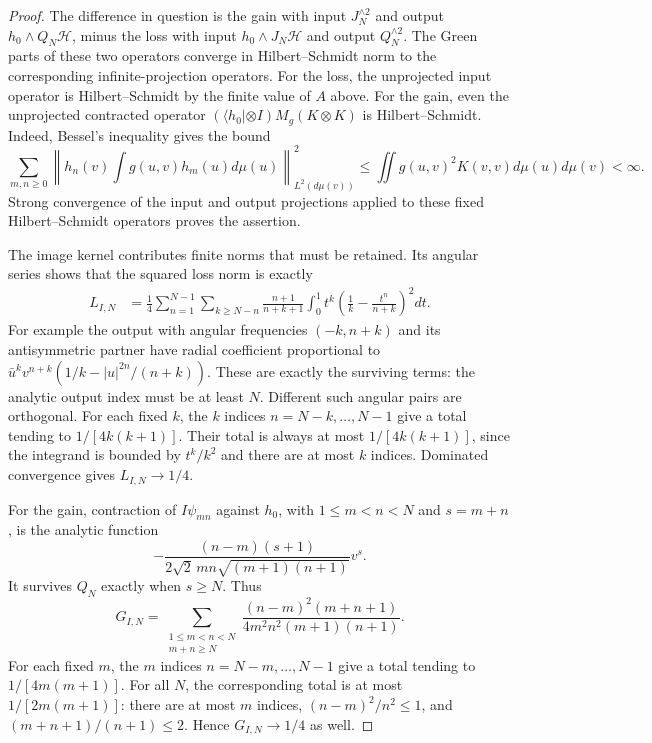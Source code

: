 \documentclass[11pt,a4paper]{article}
\numberwithin{equation}{section}
\theoremstyle{definition}
\theoremstyle{remark}
\begin{document}
\begin{proof}
The difference in question is the gain with input $J_N^{\wedge2}$
and output $h_0\wedge Q_N\mathcal H$, minus the loss with input
$h_0\wedge J_N\mathcal H$ and output $Q_N^{\wedge2}$.
The Green parts of these two operators converge in Hilbert--Schmidt
norm to the corresponding infinite-projection operators.  For the
loss, the unprojected input operator is Hilbert--Schmidt by the finite
value of $A$ above.  For the gain, even the unprojected contracted
operator
$(\langle h_0|\otimes I)M_g(K\otimes K)$ is Hilbert--Schmidt.
Indeed, Bessel's inequality gives the bound
\[
 \sum_{m,n\ge0}\left\|h_n(v)
       \int g(u,v)h_m(u)d\mu(u)\right\|_{L^2(d\mu(v))}^2
 \le\iint g(u,v)^2 K(v,v)d\mu(u)d\mu(v)<\infty.
\]
Strong convergence of the input and output projections applied to
these fixed Hilbert--Schmidt operators proves the assertion.

The image kernel contributes finite norms that must be retained.
Its angular series shows that the squared loss norm is exactly
\begin{align}
 L_{I,N}
 &=\frac14\sum_{n=1}^{N-1}\sum_{k\ge N-n}
 \frac{n+1}{n+k+1}\int_0^1t^k
                   \left(\frac1k-\frac{t^n}{n+k}\right)^2dt.
 \label{eq:beta2-exact-center-image-loss}
\end{align}
For example the output with angular frequencies $(-k,n+k)$
and its antisymmetric partner have radial coefficient
proportional to $\bar u^k v^{n+k}(1/k-|u|^{2n}/(n+k))$.
These are exactly the surviving terms: the analytic output index
must be at least $N$.  Different such angular pairs are orthogonal.
For each fixed $k$, the $k$ indices $n=N-k,\ldots,N-1$ give a
total tending to $1/[4k(k+1)]$.  Their total is always at most
$1/[4k(k+1)]$, since the integrand is bounded by $t^k/k^2$
and there are at most $k$ indices.  Dominated convergence gives
$L_{I,N}\to1/4$.

For the gain, contraction of $I\psi_{mn}$ against $h_0$, with
$1\le m<n<N$ and $s=m+n$, is the analytic function
\[
 -\frac{(n-m)(s+1)}{2\sqrt2\,mn\sqrt{(m+1)(n+1)}}v^s.
\]
It survives $Q_N$ exactly when $s\ge N$.  Thus
\begin{equation}
 G_{I,N}=
 \sum_{\substack{1\le m<n<N\\m+n\ge N}}
 \frac{(n-m)^2(m+n+1)}{4m^2n^2(m+1)(n+1)}.
 \label{eq:beta2-exact-center-image-gain}
\end{equation}
For each fixed $m$, the $m$ indices $n=N-m,\ldots,N-1$
give a total tending to $1/[4m(m+1)]$.  For all $N$, the
corresponding total is at most $1/[2m(m+1)]$: there are at
most $m$ indices, $(n-m)^2/n^2\le1$, and
$(m+n+1)/(n+1)\le2$.  Hence $G_{I,N}\to1/4$ as well.


\end{proof}
\end{document}
